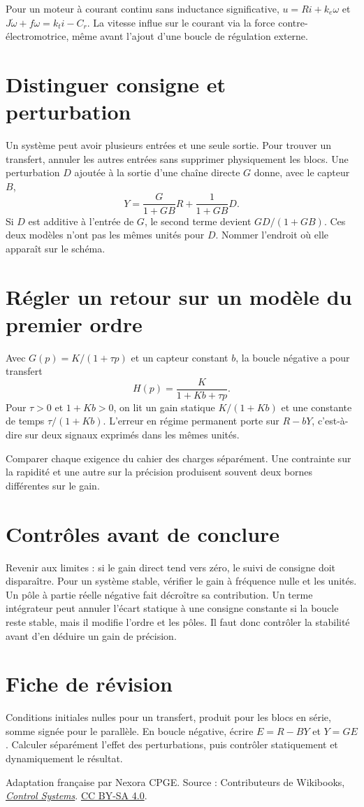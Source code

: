 \documentclass[11pt,a4paper]{article}
\begin{document}
Pour un moteur à courant continu sans inductance significative, $u=Ri+k_e\omega$ et $J\dot\omega+f\omega=k_t i-C_r$. La vitesse influe sur le courant via la force contre-électromotrice, même avant l’ajout d’une boucle de régulation externe.

\section*{Distinguer consigne et perturbation}
Un système peut avoir plusieurs entrées et une seule sortie. Pour trouver un transfert, annuler les autres entrées sans supprimer physiquement les blocs. Une perturbation $D$ ajoutée à la sortie d’une chaîne directe $G$ donne, avec le capteur $B$,
\[ Y=\frac{G}{1+GB}R+\frac{1}{1+GB}D. \]
Si $D$ est additive à l’entrée de $G$, le second terme devient $GD/(1+GB)$. Ces deux modèles n’ont pas les mêmes unités pour $D$. Nommer l’endroit où elle apparaît sur le schéma.

\section*{Régler un retour sur un modèle du premier ordre}
Avec $G(p)=K/(1+\tau p)$ et un capteur constant $b$, la boucle négative a pour transfert
\[ H(p)=\frac{K}{1+Kb+\tau p}. \]
Pour $\tau>0$ et $1+Kb>0$, on lit un gain statique $K/(1+Kb)$ et une constante de temps $\tau/(1+Kb)$. L’erreur en régime permanent porte sur $R-bY$, c’est-à-dire sur deux signaux exprimés dans les mêmes unités.

Comparer chaque exigence du cahier des charges séparément. Une contrainte sur la rapidité et une autre sur la précision produisent souvent deux bornes différentes sur le gain.

\section*{Contrôles avant de conclure}
Revenir aux limites : si le gain direct tend vers zéro, le suivi de consigne doit disparaître. Pour un système stable, vérifier le gain à fréquence nulle et les unités. Un pôle à partie réelle négative fait décroître sa contribution. Un terme intégrateur peut annuler l’écart statique à une consigne constante si la boucle reste stable, mais il modifie l’ordre et les pôles. Il faut donc contrôler la stabilité avant d’en déduire un gain de précision.

\section*{Fiche de révision}
Conditions initiales nulles pour un transfert, produit pour les blocs en série, somme signée pour le parallèle. En boucle négative, écrire $E=R-BY$ et $Y=GE$. Calculer séparément l’effet des perturbations, puis contrôler statiquement et dynamiquement le résultat.

\bigskip
{\footnotesize Adaptation française par Nexora CPGE. Source : Contributeurs de Wikibooks,
\href{https://en.wikibooks.org/wiki/Control_Systems/Feedback_Loops}{\textit{Control Systems}}.
\href{https://creativecommons.org/licenses/by-sa/4.0/}{CC BY-SA 4.0}.}
\end{document}
